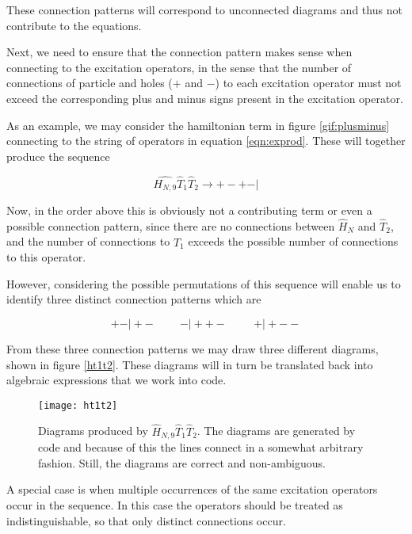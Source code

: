 These connection patterns will correspond to unconnected diagrams and thus not contribute to the equations. 

Next, we need to ensure that the connection pattern makes sense when connecting to the excitation operators, in the sense that the number of connections of particle and holes ($+$ and $-$) to each excitation operator must not exceed the corresponding plus and minus signs present in the excitation operator.

As an example, we may consider the hamiltonian term in figure \ref{gif:plusminus} connecting to the string of operators in equation \ref{eqn:exprod}. These will together produce the sequence

\begin{equation}
\hat{H_{N,9}} \hat{T}_1 \hat{T}_2 \rightarrow  + - + - \vert 
\end{equation}

Now, in the order above this is obviously not a contributing term or even a possible connection pattern, since there are no connections between $\hat{H}_N$ and $\hat{T}_2$, and the number of connections to $\hat{T}_1$ exceeds the possible number of connections to this operator. 

However, considering the possible permutations of this sequence will enable us to identify three distinct connection patterns which are

\begin{equation}
  + -\vert  + - \hspace{1cm}  -\vert  + + -  \hspace{1cm}  + \vert  + - -
\end{equation}

From these three connection patterns we may draw three different diagrams, shown in figure \ref{ht1t2}. These diagrams will in turn be translated back into algebraic expressions that we work into code.

\begin{figure}
 \centering
  \texttt{[image: ht1t2]}
  \caption{Diagrams produced by $\hat{H}_{N,9} \hat{T}_1 \hat{T}_2 $. The diagrams are generated by code and because of this the lines connect in a somewhat arbitrary fashion. Still, the diagrams are correct and non-ambiguous.}\label{fig:ht1t2}
\end{figure}

A special case is when multiple occurrences of the same excitation operators occur in the sequence. In this case the operators should be treated as indistinguishable, so that only distinct connections occur.

